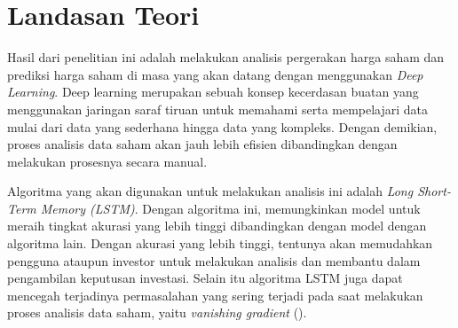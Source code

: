 \section{Landasan Teori}
\indent

Hasil dari penelitian ini adalah melakukan analisis pergerakan harga saham dan prediksi harga saham di masa yang akan datang dengan menggunakan \textit{Deep Learning}. Deep learning merupakan sebuah konsep kecerdasan buatan yang menggunakan jaringan saraf tiruan untuk memahami serta mempelajari data mulai dari data yang sederhana hingga data yang kompleks. Dengan demikian, proses analisis data saham akan jauh lebih efisien dibandingkan dengan melakukan prosesnya secara manual.

Algoritma yang akan digunakan untuk melakukan analisis ini adalah \textit{Long Short-Term Memory (LSTM)}. Dengan algoritma ini, memungkinkan model untuk meraih tingkat akurasi yang lebih tinggi dibandingkan dengan model dengan algoritma lain. Dengan akurasi yang lebih tinggi, tentunya akan memudahkan pengguna ataupun investor untuk melakukan analisis dan membantu dalam pengambilan keputusan investasi. Selain itu algoritma LSTM juga dapat mencegah terjadinya permasalahan yang sering terjadi pada saat melakukan proses analisis data saham, yaitu \textit{vanishing gradient} (\cite{sofi2021perbandingan}).

